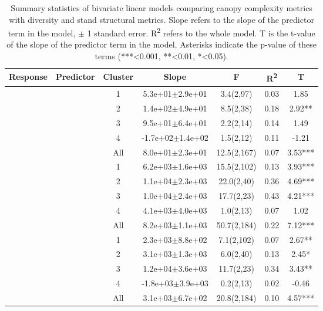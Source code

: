 \begin{longtable}{llccccS[table-format=-2.2, table-space-text-post = {***}]}
\caption{Summary statistics of bivariate linear models comparing canopy complexity metrics with diversity and stand structural metrics. Slope refers to the slope of the predictor term in the model, $\pm{}$ 1 standard error. R\textsuperscript{2} refers to the whole model. T is the t-value of the slope of the predictor term in the model, Asterisks indicate the p-value of these terms (***<0.001, **<0.01, *<0.05).} \\ 
  \toprule
{Response} & {Predictor} & {Cluster} & {Slope} & {F} & {R\textsuperscript{2}} & {T} \\ 
  \midrule
{} & {} & 1 &  5.3e+01$\pm$2.9e+01 & 3.4(2,97) & 0.03 & 1.85 \\ 
   &  & 2 &  1.4e+02$\pm$4.9e+01 & 8.5(2,38) & 0.18 & 2.92** \\ 
   &  & 3 &  9.5e+01$\pm$6.4e+01 & 2.2(2,14) & 0.14 & 1.49 \\ 
   &  & 4 & -1.7e+02$\pm$1.4e+02 & 1.5(2,12) & 0.11 & -1.21 \\ 
   &  & All &  8.0e+01$\pm$2.3e+01 & 12.5(2,167) & 0.07 & 3.53*** \\ 
   \midrule
{} & {} & 1 &  6.2e+03$\pm$1.6e+03 & 15.5(2,102) & 0.13 & 3.93*** \\ 
   &  & 2 &  1.1e+04$\pm$2.3e+03 & 22.0(2,40) & 0.36 & 4.69*** \\ 
   &  & 3 &  1.0e+04$\pm$2.4e+03 & 17.7(2,23) & 0.43 & 4.21*** \\ 
   &  & 4 &  4.1e+03$\pm$4.0e+03 & 1.0(2,13) & 0.07 & 1.02 \\ 
   &  & All &  8.2e+03$\pm$1.1e+03 & 50.7(2,184) & 0.22 & 7.12*** \\ 
   \midrule
{} & {} & 1 &  2.3e+03$\pm$8.8e+02 & 7.1(2,102) & 0.07 & 2.67** \\ 
   &  & 2 &  3.1e+03$\pm$1.3e+03 & 6.0(2,40) & 0.13 & 2.45* \\ 
   &  & 3 &  1.2e+04$\pm$3.6e+03 & 11.7(2,23) & 0.34 & 3.43** \\ 
   &  & 4 & -1.8e+03$\pm$3.9e+03 & 0.2(2,13) & 0.02 & -0.46 \\ 
   &  & All &  3.1e+03$\pm$6.7e+02 & 20.8(2,184) & 0.10 & 4.57*** \\ 

\end{longtable}
